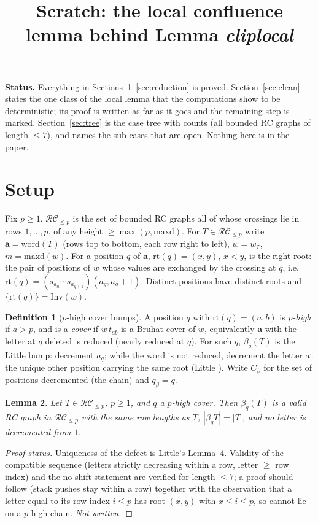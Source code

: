 \documentclass{amsart}
\title{Scratch: the local confluence lemma behind Lemma \emph{cliplocal}}
\author{}
\date{}
\newtheorem{lemma}{Lemma}[section]
\theoremstyle{definition}
\newtheorem{definition}[lemma]{Definition}
\theoremstyle{remark}
\newcommand{\RC}{\mathcal{RC}}
\newcommand{\maxd}{\mathrm{maxd}}
\newcommand{\wof}[1]{w_{#1}}
\newcommand{\rt}{\mathrm{rt}}
\begin{document}
\maketitle

\noindent\textbf{Status.} Everything in Sections~\ref{sec:setup}--\ref{sec:reduction} is proved. Section~\ref{sec:clean} states the one class of the local lemma that the computations show to be deterministic; its proof is written as far as it goes and the remaining step is marked. Section~\ref{sec:tree} is the case tree with counts (all bounded RC graphs of length $\leq 7$), and names the sub-cases that are open. Nothing here is in the paper.

\section{Setup}\label{sec:setup}

Fix $p\geq 1$. $\RC_{\leq p}$ is the set of bounded RC graphs all of whose crossings lie in rows $1,\ldots,p$, of any height $\geq\max(p,\maxd)$. For $T\in\RC_{\leq p}$ write $\mathbf a=\mathrm{word}(T)$ (rows top to bottom, each row right to left), $w=\wof{T}$, $m=\maxd(w)$. For a position $q$ of $\mathbf a$, $\rt(q)=(x,y)$, $x<y$, is the right root: the pair of positions of $w$ whose values are exchanged by the crossing at $q$, i.e.\ $\rt(q)=(s_{a_n}\cdots s_{a_{q+1}})(a_q,a_q+1)$. Distinct positions have distinct roots and $\{\rt(q)\}=\mathrm{Inv}(w)$.

\begin{definition}[$p$-high cover bumps]
A position $q$ with $\rt(q)=(a,b)$ is \emph{$p$-high} if $a>p$, and is a \emph{cover} if $w\,t_{ab}$ is a Bruhat cover of $w$, equivalently $\mathbf a$ with the letter at $q$ deleted is reduced (nearly reduced at $q$). For such $q$, $\beta_q(T)$ is the Little bump: decrement $a_q$; while the word is not reduced, decrement the letter at the unique other position carrying the same root (Little \cite[Lemma~4]{L}). Write $C_\beta$ for the set of positions decremented (the chain) and $q_\beta=q$.
\end{definition}

\begin{lemma}\label{lem:wd}
Let $T\in\RC_{\leq p}$, $p\geq 1$, and $q$ a $p$-high cover. Then $\beta_q(T)$ is a valid RC graph in $\RC_{\leq p}$ with the same row lengths as $T$, $|\beta_q T|=|T|$, and no letter is decremented from $1$.
\end{lemma}
\begin{proof}[Proof status]
Uniqueness of the defect is Little's Lemma~4. Validity of the compatible sequence (letters strictly decreasing within a row, letter $\geq$ row index) and the no-shift statement are verified for length $\leq 7$; a proof should follow \cite[Lemma~3.1]{BHY} (stack pushes stay within a row) together with the observation that a letter equal to its row index $i\leq p$ has root $(x,y)$ with $x\leq i\leq p$, so cannot lie on a $p$-high chain. \emph{Not written.}
\end{proof}
\end{document}
